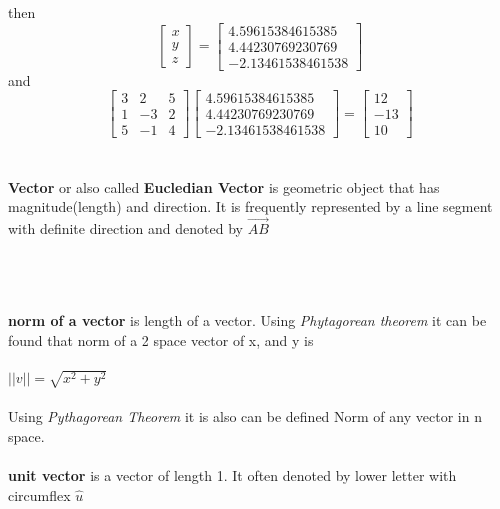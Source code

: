 \documentclass[a4paper, 12pt]{article}
\begin{document}
then 
\[
\left[{
\begin{array}{c}
x \\
y \\
z
\end{array}
}\right] 
=
\left[{
\begin{array}{c}
4.59615384615385 \\
4.44230769230769 \\
-2.13461538461538
\end{array}
}\right] 
\]
and
\[
\left[{
\begin{array}{ccc}
3 & 2 & 5 \\
1 & -3  & 2\\
5 & -1  & 4
\end{array}
} \right]
\left[{
\begin{array}{c}
4.59615384615385 \\
4.44230769230769 \\
-2.13461538461538
\end{array}
}\right] 
=
\left[{
\begin{array}{c} 
12 \\
-13 \\
10
\end{array}
} \right] 
\]
\\
\\
\textbf{Vector} or also called \textbf{Eucledian Vector} is geometric object that has magnitude(length) and direction. It is frequently
represented by a line segment with definite direction and denoted by $\overrightarrow{AB}$
\\
\\ 
\\
\\
\textbf{norm of a vector} is length of a vector. Using \textit{Phytagorean theorem} it can be found that norm of a 2 space vector of x, and y is
\\
\\
$||v|| = \sqrt{x^2 + y^2}$
\\
\\
Using \textit{Pythagorean Theorem} it is also can be defined Norm of any vector in n space.
\\
\\
\textbf{unit vector} is a vector of length 1. It often denoted by lower letter with circumflex $\hat{u}$
\end{document}
